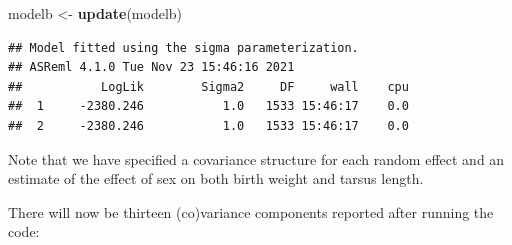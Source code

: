 \documentclass[
  12pt,
]{book}
\newenvironment{Shaded}{\begin{snugshade}}{\end{snugshade}}
\newcommand{\KeywordTok}[1]{\textcolor[rgb]{0.13,0.29,0.53}{\textbf{#1}}}
\newcommand{\NormalTok}[1]{#1}
\newcommand{\OperatorTok}[1]{\textcolor[rgb]{0.81,0.36,0.00}{\textbf{#1}}}
\newcommand{\StringTok}[1]{\textcolor[rgb]{0.31,0.60,0.02}{#1}}
\begin{document}
\begin{Shaded}
\begin{Highlighting}[]
\NormalTok{modelb \textless{}{-}}\StringTok{ }\KeywordTok{update}\NormalTok{(modelb)}
\end{Highlighting}
\end{Shaded}

\begin{verbatim}
## Model fitted using the sigma parameterization.
## ASReml 4.1.0 Tue Nov 23 15:46:16 2021
##           LogLik        Sigma2     DF     wall    cpu
##  1     -2380.246           1.0   1533 15:46:17    0.0
##  2     -2380.246           1.0   1533 15:46:17    0.0
\end{verbatim}

Note that we have specified a covariance structure for each random effect and an estimate of the effect of sex on both birth weight and tarsus length.

There will now be thirteen (co)variance components reported after running the code:

\begin{Shaded}
\end{Shaded}
\end{document}
